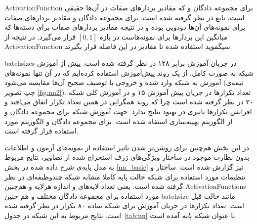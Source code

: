  \gls{ActivationFunction} برای مجموعه دادگان   و  که مقادیر بردارهای صفات در آن‌ها حقیقی است، تابع  در نظر گرفته شده است. برای مجموعه دادگان  و   مقادیر بردارهای صفات برای نمونه‌های آن‌ها دودویی بوده و در نتیجه مقادیر بردارهای صفات برای دسته‌ها که میانگین این بردارها برای نمونه‌هاست در بازه
$[0,1]$
قرار می‌گیرد. در نتیجه از \gls{ActivationFunction} سیگموید استفاده شده تا مقادیر در این فاصله قرار بگیرند.

 \glspl{batchsize} در جریان آموزش برابر ۱۲۸ در نظر گرفته شده است.
پیش از آموزش شبکه به صورت کامل، از یک روند پیش‌آموزش استفاده کرده‌ایم که در آن تنها نمونه‌های آموزش به شبکه وارد شده و خروجی با توصیف صحیح آن‌ها مقایسه می‌شود (نیمه‌ی چپ تصویر
\ref{fig:nn2}).
تعداد تکرارها در جریان پیش آموزش ۱۵ و در آموزش کلی شبکه ۳۰ در نظر گرفته شده است چرا که روند همگرایی در همین تعداد تکرار اتفاق می‌افتد و افزایش تکرارها تاثیری در بهبود نتایج ندارد.
جهت آموزش شبکه برای مجموعه دادگان  و  از الگوریتم بهینه‌سازی 
\cite{adam}
استفاه شده است. برای مجموعه دادگان  و  الگوریتم
 \cite{adadelta}
مورد استفاده قرار گرفته است.

در این بخش هم‌چنین برای روشن‌تر شدن تاثیر استفاده از نمونه‌های آزمون و اطلاعات بدون نظارت موجود در ساختار ویژگی‌های ژرف استخراج شده از تصاویر، نتایج مربوط به مدل پایه‌ی شرح داده شده در بخش
\ref{nn_basic}
نیز گزارش شده است. ساختار و تنظیمات مورد استفاده برای شبکه حالت پایه کاملا مشابه شبکه چندوظیفه‌ای در نظر گرفته شده است. یعنی تعداد لایه‌های و اندازه هرلایه و هم‌چنین
\glspl{ActivationFunction}
مورد استفاده برای مجموعه دادگان مختلف و هم چنین
\gls{batchsize}
مانند حالت قبل است. تعداد تکرارها در جریان آموزش برای شبکه ساده ۸۰ تکرار در نظر گرفته شده است. نتایج مربوط به این شبکه در جدول \ref{tab:nn} با عنوان
\textit{ شبکه پایه}
آمده است.


